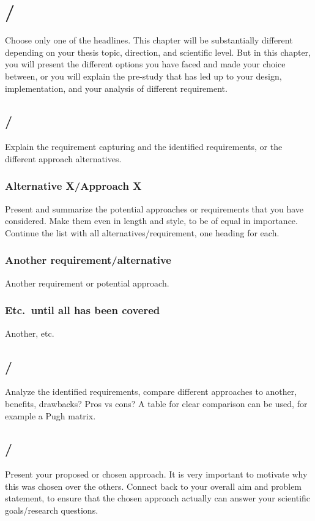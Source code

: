 \section{/}\label{sec:prestudy} 

Choose only one of the headlines. This chapter will be substantially different depending on your
thesis topic, direction, and scientific level. But in this chapter, you will present the different
options you have faced and made your choice between, or you will explain the pre-study that has led
up to your design, implementation, and your analysis of different requirement.        

\subsection{/}\label{subsec:solutionalt}
Explain the requirement capturing and the identified requirements, or the different approach alternatives.

\subsubsection{Alternative X/Approach X}\label{subsubsec:altx}
Present and summarize the potential approaches or requirements that you have considered. Make them
even in length and style, to be of equal in importance. Continue the list with all
alternatives/requirement, one heading for each.

\subsubsection{Another requirement/alternative}
Another requirement or potential approach.

\subsubsection{Etc.\ until all has been covered}
Another, etc.

\subsection{/}\label{subsec:compareapproach}
Analyze the identified requirements, compare different approaches to another, benefits, drawbacks?
Pros vs cons? A table for clear comparison can be used, for example a Pugh matrix.

\subsection{/}\label{subsec:chosenapproach}
Present your proposed or chosen approach. It is very important to motivate why this was chosen over
the others. Connect back to your overall aim and problem statement, to ensure that the chosen
approach actually can answer your scientific goals/research questions.

